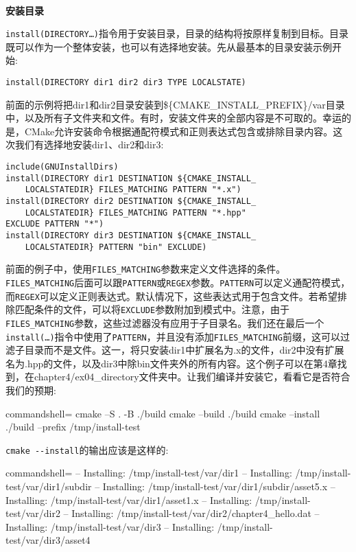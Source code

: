 \hspace*{\fill} \\ %
\noindent
\textbf{安装目录}

\texttt{install(DIRECTORY…)}指令用于安装目录，目录的结构将按原样复制到目标。目录既可以作为一个整体安装，也可以有选择地安装。先从最基本的目录安装示例开始:

\begin{lstlisting}[style=styleCMake]
install(DIRECTORY dir1 dir2 dir3 TYPE LOCALSTATE)
\end{lstlisting}

前面的示例将把dir1和dir2目录安装到\$\{CMAKE\_INSTALL\_PREFIX\}/var目录中，以及所有子文件夹和文件。有时，安装文件夹的全部内容是不可取的。幸运的是，CMake允许安装命令根据通配符模式和正则表达式包含或排除目录内容。这次我们有选择地安装dir1、dir2和dir3:

\begin{lstlisting}[style=styleCMake]
include(GNUInstallDirs)
install(DIRECTORY dir1 DESTINATION ${CMAKE_INSTALL_
	LOCALSTATEDIR} FILES_MATCHING PATTERN "*.x")
install(DIRECTORY dir2 DESTINATION ${CMAKE_INSTALL_
	LOCALSTATEDIR} FILES_MATCHING PATTERN "*.hpp"
EXCLUDE PATTERN "*")
install(DIRECTORY dir3 DESTINATION ${CMAKE_INSTALL_
	LOCALSTATEDIR} PATTERN "bin" EXCLUDE)
\end{lstlisting}

前面的例子中，使用\texttt{FILES\_MATCHING}参数来定义文件选择的条件。\texttt{FILES\_MATCHING}后面可以跟\texttt{PATTERN}或\texttt{REGEX}参数。\texttt{PATTERN}可以定义通配符模式，而\texttt{REGEX}可以定义正则表达式。默认情况下，这些表达式用于包含文件。若希望排除匹配条件的文件，可以将\texttt{EXCLUDE}参数附加到模式中。注意，由于\texttt{FILES\_MATCHING}参数，这些过滤器没有应用于子目录名。我们还在最后一个\texttt{install(…)}指令中使用了\texttt{PATTERN}，并且没有添加\texttt{FILES\_MATCHING}前缀，这可以过滤子目录而不是文件。这一，将只安装dir1中扩展名为.x的文件，dir2中没有扩展名为.hpp的文件，以及dir3中除bin文件夹外的所有内容。这个例子可以在第4章找到，在chapter4/ex04\_directory文件夹中。让我们编译并安装它，看看它是否符合我们的预期:

\begin{tcblisting}{commandshell={}}
cmake –S . -B ./build
cmake –build ./build
cmake –install ./build –prefix /tmp/install-test
\end{tcblisting}

\texttt{cmake -{}-install}的输出应该是这样的:

\begin{tcblisting}{commandshell={}}
-- Installing: /tmp/install-test/var/dir1
-- Installing: /tmp/install-test/var/dir1/subdir
-- Installing: /tmp/install-test/var/dir1/subdir/asset5.x
-- Installing: /tmp/install-test/var/dir1/asset1.x
-- Installing: /tmp/install-test/var/dir2
-- Installing: /tmp/install-test/var/dir2/chapter4_hello.dat
-- Installing: /tmp/install-test/var/dir3
-- Installing: /tmp/install-test/var/dir3/asset4
\end{tcblisting}

